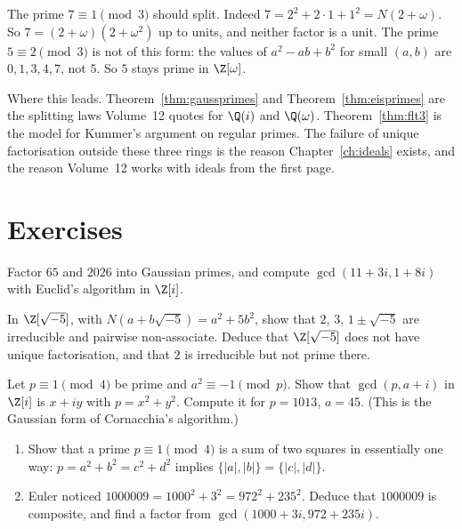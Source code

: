 \begin{examplex}
The prime $7\equiv 1\pmod 3$ should split. Indeed $7=2^2+2\cdot 1+1^2=N(2+\omega)$. So $7=(2+\omega)(2+\omega^2)$ up to units, and neither factor is a unit. The prime $5\equiv 2\pmod 3$ is not of this form: the values of $a^2-ab+b^2$ for small $(a,b)$ are $0,1,3,4,7$, not $5$. So $5$ stays prime in $\Z[\omega]$.
\end{examplex}

\begin{beauty}
Where this leads. Theorem~\ref{thm:gaussprimes} and Theorem~\ref{thm:eisprimes} are the splitting laws Volume~12 quotes for $\Q(i)$ and $\Q(\omega)$. Theorem~\ref{thm:flt3} is the model for Kummer's argument on regular primes. The failure of unique factorisation outside these three rings is the reason Chapter~\ref{ch:ideals} exists, and the reason Volume~12 works with ideals from the first page.
\end{beauty}

\section{Exercises}

\begin{exercise}[$\star$]\label{ex:gaussfactor}
Factor $65$ and $2026$ into Gaussian primes, and compute $\gcd(11+3i,1+8i)$ with Euclid's algorithm in $\Z[i]$.
\end{exercise}

\begin{exercise}[$\star$]\label{ex:zsqrt5}
In $\Z[\sqrt{-5}]$, with $N(a+b\sqrt{-5})=a^2+5b^2$, show that $2$, $3$, $1\pm\sqrt{-5}$ are irreducible and pairwise non-associate. Deduce that $\Z[\sqrt{-5}]$ does not have unique factorisation, and that $2$ is irreducible but not prime there.
\end{exercise}

\begin{exercise}[$\star\star$]\label{ex:gaussgcd}
Let $p\equiv1\pmod4$ be prime and $a^2\equiv-1\pmod p$. Show that $\gcd(p,a+i)$ in $\Z[i]$ is $x+iy$ with $p=x^2+y^2$. Compute it for $p=1013$, $a=45$. (This is the Gaussian form of Cornacchia's algorithm.)
\end{exercise}

\begin{exercise}[$\star\star$]\label{ex:euler1000009}
\begin{enumerate}[label=(\alph*)]
\item Show that a prime $p\equiv1\pmod4$ is a sum of two squares in essentially one way: $p=a^2+b^2=c^2+d^2$ implies $\{|a|,|b|\}=\{|c|,|d|\}$.
\item Euler noticed $1000009=1000^2+3^2=972^2+235^2$. Deduce that $1000009$ is composite, and find a factor from $\gcd(1000+3i,972+235i)$.
\end{enumerate}
\end{exercise}

